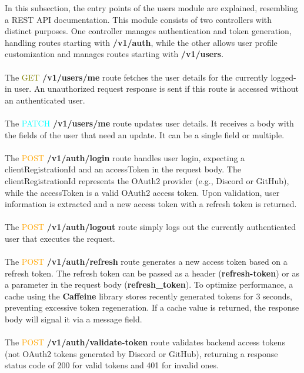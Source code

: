 In this subsection, the entry points of the users module are explained, resembling a REST API documentation. This module consists of two controllers with distinct purposes. One controller manages authentication and token generation, handling routes starting with \textbf{/v1/auth}, while the other allows user profile customization and manages routes starting with \textbf{/v1/users}.
\\\\
\noindent The \textcolor{olive}{GET} \textbf{/v1/users/me} route fetches the user details for the currently logged-in user. An unauthorized request response is sent if this route is accessed without an authenticated user.
\\\\
\noindent The \textcolor{cyan}{PATCH} \textbf{/v1/users/me} route updates user details. It receives a body with the fields of the user that need an update. It can be a single field or multiple.
\\\\
\noindent The \textcolor{orange}{POST} \textbf{/v1/auth/login} route handles user login, expecting a clientRegistrationId and an accessToken in the request body. The clientRegistrationId represents the OAuth2 provider (e.g., Discord or GitHub), while the accessToken is a valid OAuth2 access token. Upon validation, user information is extracted and a new access token with a refresh token is returned.
\\\\
\noindent The \textcolor{orange}{POST} \textbf{/v1/auth/logout} route simply logs out the currently authenticated user that executes the request.
\\\\
\noindent The \textcolor{orange}{POST} \textbf{/v1/auth/refresh} route generates a new access token based on a refresh token. The refresh token can be passed as a header (\textbf{refresh-token}) or as a parameter in the request body (\textbf{refresh\_token}). To optimize performance, a cache using the \textbf{Caffeine} library stores recently generated tokens for 3 seconds, preventing excessive token regeneration. If a cache value is returned, the response body will signal it via a message field.
\\\\
\noindent The \textcolor{orange}{POST} \textbf{/v1/auth/validate-token} route validates backend access tokens (not OAuth2 tokens generated by Discord or GitHub), returning a response status code of 200 for valid tokens and 401 for invalid ones.

